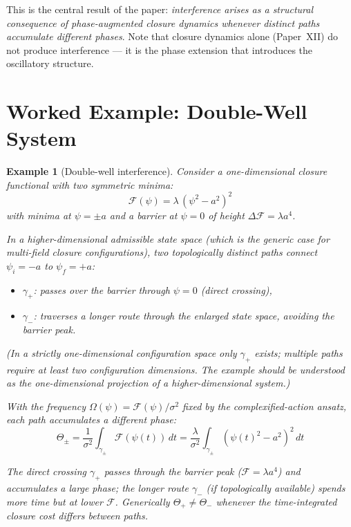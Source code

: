 \documentclass[12pt]{article}
\newtheorem{example}[theorem]{Example}
\newcommand{\Fcal}{\mathcal{F}}
\begin{document}
This is the central result of the paper: \textit{interference arises as a structural consequence of phase-augmented closure dynamics whenever distinct paths accumulate different phases}. Note that closure dynamics alone (Paper~XII) do not produce interference --- it is the phase extension that introduces the oscillatory structure.

\section{Worked Example: Double-Well System}\label{sec:example}

\begin{example}[Double-well interference]\label{ex:doublewell}
Consider a one-dimensional closure functional with two symmetric minima:
\begin{equation}
    \Fcal(\psi) = \lambda\, (\psi^2 - a^2)^2
\end{equation}
with minima at $\psi = \pm a$ and a barrier at $\psi = 0$ of height $\Delta\Fcal = \lambda a^4$.

In a higher-dimensional admissible state space (which is the generic case for multi-field closure configurations), two topologically distinct paths connect $\psi_i = -a$ to $\psi_f = +a$:
\begin{itemize}
    \item $\gamma_+$: passes over the barrier through $\psi = 0$ (direct crossing),
    \item $\gamma_-$: traverses a longer route through the enlarged state space, avoiding the barrier peak.
\end{itemize}
(In a strictly one-dimensional configuration space only $\gamma_+$ exists; multiple paths require at least two configuration dimensions. The example should be understood as the one-dimensional projection of a higher-dimensional system.)

With the frequency $\Omega(\psi) = \Fcal(\psi)/\sigma^2$ fixed by the complexified-action ansatz, each path accumulates a different phase:
\begin{equation}
    \Theta_\pm = \frac{1}{\sigma^2}\int_{\gamma_\pm} \Fcal(\psi(t))\, dt = \frac{\lambda}{\sigma^2}\int_{\gamma_\pm} (\psi(t)^2 - a^2)^2\, dt
\end{equation}

The direct crossing $\gamma_+$ passes through the barrier peak ($\Fcal = \lambda a^4$) and accumulates a large phase; the longer route $\gamma_-$ (if topologically available) spends more time but at lower $\Fcal$. Generically $\Theta_+ \neq \Theta_-$ whenever the time-integrated closure cost differs between paths.


\end{example}
\end{document}
